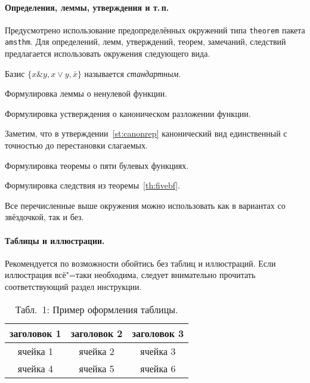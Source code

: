 \begin{vkrthesis}
\paragraph{Определения, леммы, утверждения и т.\,п.}
Предусмотрено использование предопределённых окружений типа
\texttt{theorem} пакета \texttt{amsthm}. Для определений, лемм, утверждений,
теорем, замечаний, следствий предлагается использовать окружения следующего
вида.
\begin{definition*}
Базис $\{x \& y, x \vee y, {\bar x}\}$ называется \emph{стандартным}.
\end{definition*}
\begin{lemma}
\label{lm:nonullfn}
Формулировка леммы о ненулевой функции.
\end{lemma}
\begin{statement}
\label{st:canonrep}
Формулировка устверждения о каноническом разложении функции.
\end{statement}
\begin{remark*}
Заметим, что в утверждении~\ref{st:canonrep} канонический вид единственный с
точностью до перестановки слагаемых.
\end{remark*}
\begin{theorem}
\label{th:fivebf}
Формулировка теоремы о пяти булевых функциях.
\end{theorem}
\begin{corollary*}
Формулировка следствия из теоремы~\ref{th:fivebf}.
\end{corollary*}
\noindent Все перечисленные выше окружения можно использовать как в вариантах
со звёздочкой, так и без.

\paragraph{Таблицы и иллюстрации.}
Рекомендуется по возможности обойтись без таблиц и иллюстраций. Если
иллюстрация всё"=таки необходима, следует внимательно прочитать соответствующий
раздел инструкции.

\begin{table*}[!ht]
\centering
\begin{tabular}{ccc} 
\textbf{заголовок 1} & \textbf{заголовок 2} & \textbf{заголовок 3} \\ 
\hline\hline
ячейка 1 & ячейка 2 & ячейка 3 \\ \hline
ячейка 4 & ячейка 5 & ячейка 6
\end{tabular}
\caption*{Табл.~1: Пример оформления таблицы.}
\end{table*}


\end{vkrthesis}
